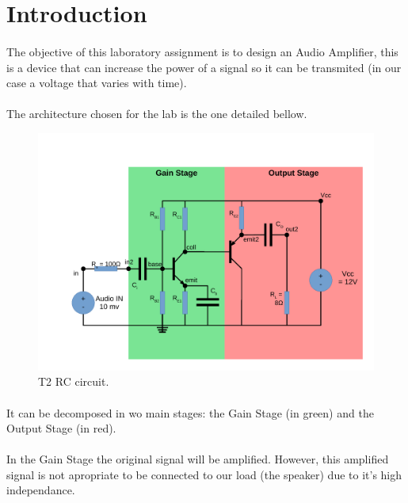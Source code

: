 \section{Introduction}
\label{sec:introduction}

\paragraph{} The objective of this laboratory assignment is to design an Audio Amplifier, this is a device that can increase the power of a 
signal so it can be transmited (in our case a voltage that varies with time).

\paragraph{} The architecture chosen for the lab is the one detailed bellow.

\begin{figure}[h]
	\centering
	\includegraphics[width=0.9\linewidth]{./Circuit.pdf}
	\caption{T2 RC circuit.}
	\label{fig:rc}
\end{figure}

\paragraph{} It can be decomposed in wo main stages: the Gain Stage (in green)  and the Output Stage (in red).

\paragraph{} In the Gain Stage the original signal will be amplified. However, this amplified signal is not apropriate to be connected to our load (the speaker) due to it's high independance.

